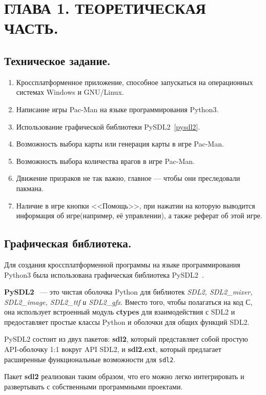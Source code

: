 \chapter{\label{ch:ch01}ГЛАВА 1. ТЕОРЕТИЧЕСКАЯ ЧАСТЬ.}

\section{\label{sec:ch01/sec01}Техническое задание.}
\begin{enumerate}
	\item Кроссплатформенное приложение, способное запускаться на операционных системах Windows и GNU/Linux.
	\item Написание игры Pac-Man на языке программирования Python3.
	\item Использование графической библиотеки PySDL2~\ref{pysdl2}.
	\item Возможность выбора карты или генерация карты в игре Pac-Man.
	\item Возможность выбора количества врагов в игре Pac-Man.
	\item Движение призраков не так важно, главное --- чтобы они преследовали пакмана.
	\item Наличие в игре кнопки <<Помощь>>, при нажатии на которую выводится информация об игре(например, её управлении), а также реферат об этой игре.
\end{enumerate}

\section{\label{sec:ch01/sec02}Графическая библиотека.}
Для создания кроссплатформенной программы на языке программирования Python3 была использована графическая библиотека PySDL2~\cite{pypiRUENpysdl2,docENpysdl2}.

\textbf{PySDL2}~\label{pysdl2} --- это чистая оболочка Python для библиотек \textit{SDL2, SDL2\_mixer, SDL2\_image, SDL2\_ttf и SDL2\_gfx}. Вместо того, чтобы полагаться на код С, она использует
встроенный модуль \textbf{ctypes} для взаимодействия с SDL2 и предоставляет простые классы Python и оболочки для общих функций SDL2.

PySDL2 состоит из двух пакетов: \textbf{sdl2}, который представляет собой простую API-оболочку 1:1 вокруг API SDL2, и \textbf{sdl2.ext}, который предлагает расширенные функциональные возможности для \texttt{sdl2}.

Пакет \textbf{sdl2} реализован таким образом, что его можно легко интегрировать и развертывать с собственными программными проектами.

